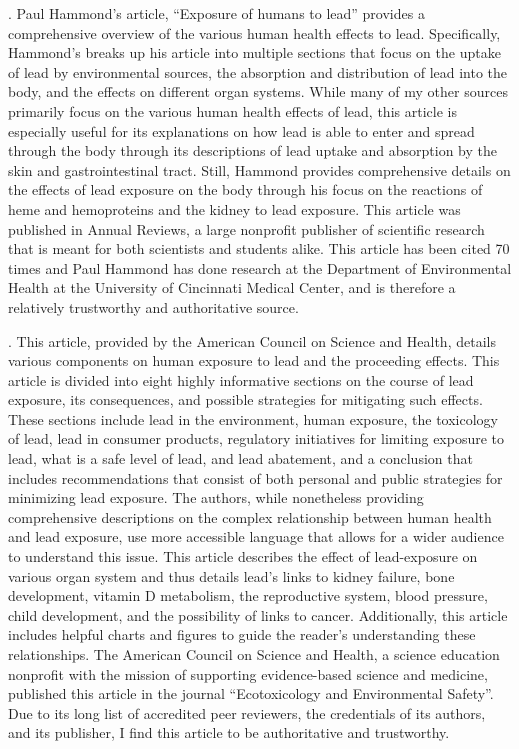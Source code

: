 \documentclass{article}\usepackage[]{graphicx}\usepackage[]{color}
\begin{document}
. 
\bigskip
Paul Hammond’s article, “Exposure of humans to lead” provides a comprehensive overview of the various human health effects to lead. Specifically, Hammond’s breaks up his article into multiple sections that focus on the uptake of lead by environmental sources, the absorption and distribution of lead into the body, and the effects on different organ systems.  While many of my other sources primarily focus on the various human health effects of lead, this article is especially useful for its explanations on how lead is able to enter and spread through the body through its descriptions of lead uptake and absorption by the skin and gastrointestinal tract. Still, Hammond provides comprehensive details on the effects of lead exposure on the body through his focus on the reactions of heme and hemoproteins and the kidney to lead exposure.  This article was published in Annual Reviews, a large nonprofit publisher of scientific research that is meant for both scientists and students alike. This article has been cited 70 times and Paul Hammond has done research at the Department of Environmental Health at the University of Cincinnati Medical Center, and is therefore a relatively trustworthy and authoritative source. 

. 
\bigskip
This article, provided by the American Council on Science and Health, details various components on human exposure to lead and the proceeding effects. This article is divided into eight highly informative sections on the course of lead exposure, its consequences, and possible strategies for mitigating such effects. These sections include lead in the environment, human exposure, the toxicology of lead, lead in consumer products, regulatory initiatives for limiting exposure to lead, what is a safe level of lead, and lead abatement, and a conclusion that includes recommendations that consist of both personal and public strategies for minimizing lead exposure.  The authors, while nonetheless providing comprehensive descriptions on the complex relationship between human health and lead exposure, use more accessible language that allows for a wider audience to understand this issue. This article describes the effect of lead-exposure on various organ system and thus details lead’s links to kidney failure, bone development, vitamin D metabolism, the reproductive system, blood pressure, child development, and the possibility of links to cancer.  Additionally, this article includes helpful charts and figures to guide the reader’s understanding these relationships. The American Council on Science and Health, a science education nonprofit with the mission of supporting evidence-based science and medicine, published this article in the journal “Ecotoxicology and Environmental Safety”. Due to its long list of accredited peer reviewers, the credentials of its authors, and its publisher, I find this article to be authoritative and trustworthy. 
\end{document}
